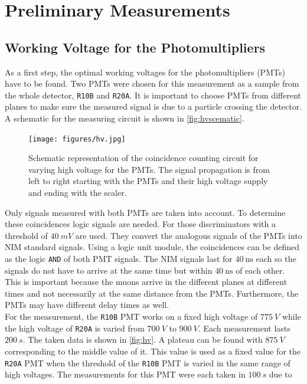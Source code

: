 \chapter{Preliminary Measurements}
\label{sec:prem}
\section{Working Voltage for the Photomultipliers}
As a first step, the optimal working voltages for the photomultipliers (PMTs) have to be found.
Two PMTs were chosen for this measurement as a sample from the whole detector, \texttt{R10B} and \texttt{R20A}.
It is important to choose PMTs from different planes to make sure the measured signal is due to a 
particle crossing the detector. A schematic for the measuring circuit is shown in \autoref{fig:hvscematic}.\\
\begin{figure}
    \centering 
    \texttt{[image: figures/hv.jpg]}
    \caption{Schematic representation of the coincidence counting circuit for varying high voltage for the PMTs. 
    The signal propagation is from left to right starting with the PMTs and their high voltage supply and ending with the scaler.}
    \label{fig:hvscematic}
\end{figure}
Only signals measured with both PMTs are taken into account. To determine these coincidences 
logic signals are needed. For those discriminators with a threshold of $\SI{40}{mV}$ are used. 
They convert the analogous signals of the PMTs into NIM standard signals. Using a logic unit module, 
the coincidences can be defined as the logic \texttt{AND} of both PMT signals. The NIM signals 
last for $\SI{40}{\ns}$ each so the signals do not have to arrive at the same time but within 
$\SI{40}{\ns}$ of each other. This is important because the muons arrive in the different planes at different times 
and not necessarily at the same distance from the PMTs. Furthermore, the PMTs may have different
delay times as well.\\
For the measurement, the \texttt{R10B} PMT works on a fixed high voltage of $\SI{775}{V}$ while the high voltage of 
\texttt{R20A} is varied from $\SI{700}{V}$ to $\SI{900}{V}$. Each measurement lasts $\SI{200}{s}$.
The taken data is shown in \autoref{fig:hv}. A plateau can be found with $\SI{875}{V}$ corresponding to the middle value 
of it. This value is used as a fixed value for the \texttt{R20A} PMT when the threshold of the \texttt{R10B}
PMT is varied in the same range of high voltages. The measurements for this PMT were each taken in $\SI{100}{s}$ due to 
